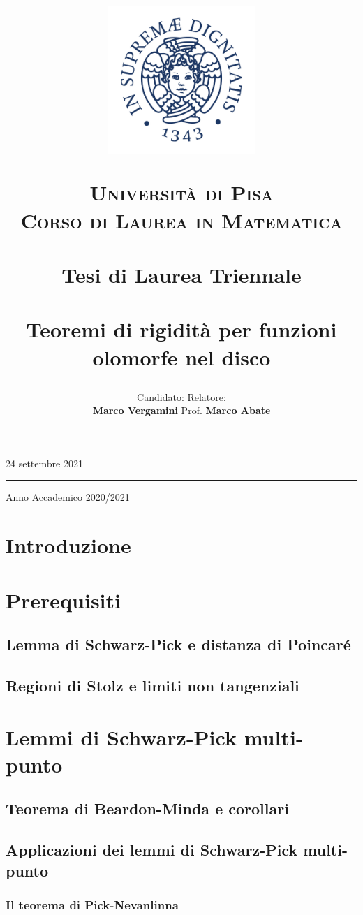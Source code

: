 \documentclass{article}
\title{\begin{figure}[t!]
  \centering
  \includegraphics[trim=0 55 0 60, clip, width=0.5\textwidth]{Stemma_unipi.jpg}
\end{figure}
\vspace{-17.5mm}
\textsc{\Large Università di Pisa}\\
\textsc{\large Corso di Laurea in Matematica}\\
\, \\
{\large Tesi di Laurea Triennale}\\
\, \\
Teoremi di rigidità per funzioni olomorfe nel disco}
\author{Candidato:  \hspace{200px} Relatore:\\
\textbf{Marco Vergamini} \hfill Prof. \textbf{Marco Abate}}
\date{}
\begin{document}
\maketitle
\vspace*{\fill}
\begin{center}
  24 settembre 2021
  \par\noindent\rule{\textwidth}{0.5pt}
  \Large Anno Accademico 2020/2021
\end{center}
\newpage
\tableofcontents
\newpage


\section*{Introduzione}


\newpage

\section{Prerequisiti}

\subsection{Lemma di Schwarz-Pick e distanza di Poincaré}


\subsection{Regioni di Stolz e limiti non tangenziali}


\newpage

\section{Lemmi di Schwarz-Pick multi-punto}

\subsection{Teorema di Beardon-Minda e corollari}


\subsection{Applicazioni dei lemmi di Schwarz-Pick multi-punto}


\subsubsection{Il teorema di Pick-Nevanlinna}

\end{document}
